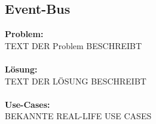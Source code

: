 \documentclass[../main.tex]{subfiles}
\begin{document}
	\subsection{Event-Bus}
	\textbf{Problem:}\\
	TEXT DER Problem BESCHREIBT\\\\
	\textbf{Lösung:}\\
	TEXT DER LÖSUNG BESCHREIBT\\\\
	\textbf{Use-Cases:}\\
	BEKANNTE REAL-LIFE USE CASES\\\\
	\clearpage	
		
\end{document}

